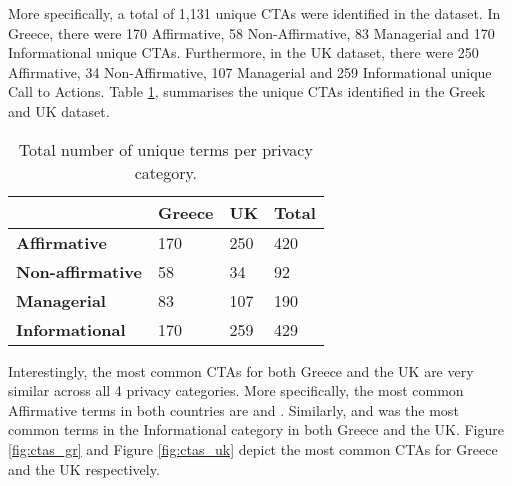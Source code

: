 \documentclass[../main.tex]{subfiles}
\begin{document}
More specifically, a total of 1,131 unique CTAs were identified in the dataset. In Greece, there were 170 Affirmative, 58 Non-Affirmative, 83 Managerial and 170 Informational unique CTAs. Furthermore, in the UK dataset, there were 250 Affirmative, 34 Non-Affirmative, 107 Managerial and 259 Informational unique Call to Actions. Table \ref{tab:unique_ctas}, summarises the unique CTAs identified in the Greek and UK dataset. 

\begin{table}[ht]
    \centering
    \begin{tabular}{@{}llll@{}}
        \toprule
                                 & \textbf{Greece} & \textbf{UK} & \textbf{Total} \\ \midrule
        \textbf{Affirmative}     & 170             & 250         & 420            \\
        \textbf{Non-affirmative} & 58              & 34          & 92             \\
        \textbf{Managerial}      & 83              & 107         & 190            \\
        \textbf{Informational}   & 170             & 259         & 429            \\ \bottomrule
    \end{tabular}
    \caption{Total number of unique terms per privacy category.}
    \label{tab:unique_ctas}
\end{table}

Interestingly, the most common CTAs for both Greece and the UK are very similar across all 4 privacy categories. More specifically, the most common Affirmative terms in both countries are  and . Similarly,  and  was the most common terms in the Informational category in both Greece and the UK. Figure \ref{fig:ctas_gr} and Figure \ref{fig:ctas_uk} depict the most common CTAs for Greece and the UK respectively.

\grAffirmativeCtas
\end{document}
